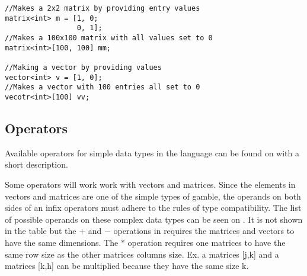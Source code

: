 \begin{lstlisting}[caption={Syntax for creating a matrix or vector},label={lst:matrix},numbers=none]
//Makes a 2x2 matrix by providing entry values
matrix<int> m = [1, 0; 
                 0, 1];
//Makes a 100x100 matrix with all values set to 0
matrix<int>[100, 100] mm;

//Making a vector by providing values
vector<int> v = [1, 0];
//Makes a vector with 100 entries all set to 0
vecotr<int>[100] vv;
\end{lstlisting}

\subsection*{Operators}
Available operators for simple data types in the language can be found on  with a short description.  


Some operators will work work with vectors and matrices.
Since the elements in vectors and matrices are one of the simple types of \gls{gamble}, the operands on both sides of an infix operators must adhere to the rules of type compatibility.
The list of possible operands on these complex data types can be seen on .
 It is not shown in the table but the $+$ and $-$ operations in  requires the matrices and vectors to have the same dimensions.
 The $*$ operation requires one matrices to have the same row size as the other matrices columns size. Ex. a matrices [j,k] and a matrices [k,h] can be multiplied because they have the same size k.


